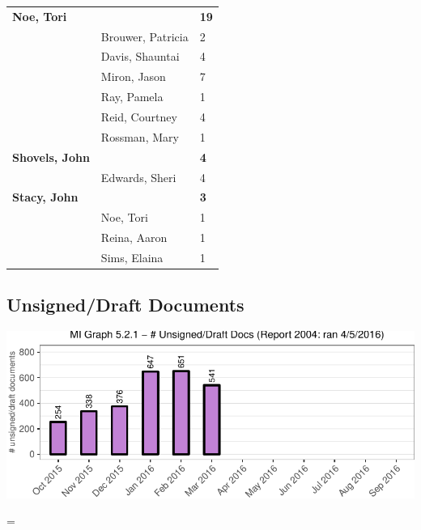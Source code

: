 \documentclass{article}\usepackage[]{graphicx}\usepackage[]{color}
\makeatletter
\def\maxwidth{ %
  \ifdim\Gin@nat@width>\linewidth
    \linewidth
  \else
    \Gin@nat@width
  \fi
}
\newenvironment{knitrout}{}{} %
\newenvironment{absolutelynopagebreak}
  {\par\nobreak\vfil\penalty0\vfilneg
   \vtop\bgroup}
  {\par\xdef\tpd{\the\prevdepth}\egroup
   \prevdepth=\tpd}
\makeatother
\begin{document}
\begin{longtable} { >{\raggedright}p{}|p{}p{}}
  \textbf{Noe, Tori} &  & \hspace{2cm}\textbf{\textbf{19}} \\ 
   & Brouwer, Patricia & 2 \\ 
   \rowcolor[gray]{0.90} & Davis, Shauntai & 4 \\ 
   \rowcolor[gray]{0.90} & Miron, Jason & 7 \\ 
   \rowcolor[gray]{0.90} & Ray, Pamela & 1 \\ 
   & Reid, Courtney & 4 \\ 
   & Rossman, Mary & 1 \\ 
  \textbf{Shovels, John} &  & \hspace{2cm}\textbf{\textbf{4}} \\ 
   \rowcolor[gray]{0.90} & Edwards, Sheri & 4 \\ 
   \rowcolor[gray]{0.90}\textbf{Stacy, John} &  & \hspace{2cm}\textbf{\textbf{3}} \\ 
   \rowcolor[gray]{0.90} & Noe, Tori & 1 \\ 
   & Reina, Aaron & 1 \\ 
   & Sims, Elaina & 1 \\ 
   \end{longtable}


\begin{absolutelynopagebreak}
\subsection{Unsigned/Draft Documents}
\begin{knitrout}
\color{fgcolor}
\includegraphics[width=\maxwidth]{figure/mi_p_unsign-1} 

\end{knitrout}
\end{absolutelynopagebreak}

\end{document}
